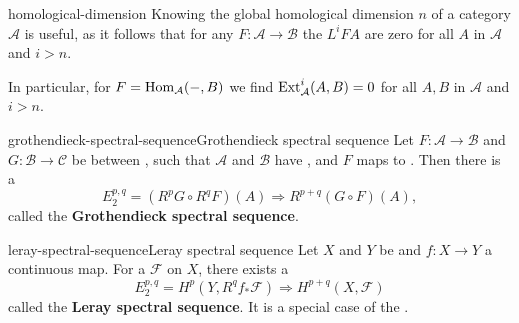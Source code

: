 \begin{example}{homological-dimension}
    Knowing the global homological dimension $n$ of a category $\mathcal{A}$ is useful, as it follows that for any  $F : \mathcal{A} \to \mathcal{B}$ the  $L^i F A$ are zero for all $A$ in $\mathcal{A}$ and $i > n$.
    
    In particular, for $F = \operatorname{Hom}_\mathcal{A}(-, B)$ we find $\textup{Ext}_\mathcal{A}^i(A, B) = 0$ for all $A, B$ in $\mathcal{A}$ and $i > n$.
\end{example}

\begin{topic}{grothendieck-spectral-sequence}{Grothendieck spectral sequence}
    Let $F : \mathcal{A} \to \mathcal{B}$ and $G : \mathcal{B} \to \mathcal{C}$ be  between , such that $\mathcal{A}$ and $\mathcal{B}$ have , and $F$ maps  to . Then there is a 
    \[ E_2^{p, q} = (R^p G \circ R^q F)(A) \Rightarrow R^{p + q}(G \circ F)(A) , \]
    called the \textbf{Grothendieck spectral sequence}.
\end{topic}

\begin{topic}{leray-spectral-sequence}{Leray spectral sequence}
    Let $X$ and $Y$ be  and $f : X \to Y$ a continuous map. For a  $\mathcal{F}$ on $X$, there exists a 
    \[ E_2^{p, q} = H^p(Y, R^q f_* \mathcal{F}) \Rightarrow H^{p + q}(X, \mathcal{F}) \]
    called the \textbf{Leray spectral sequence}. It is a special case of the .
\end{topic}

